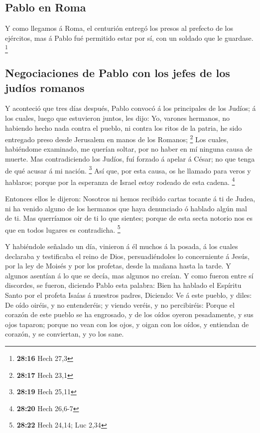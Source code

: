 \hypertarget{pablo-en-roma}{%
\subsection{Pablo en Roma}\label{pablo-en-roma}}

 Y como llegamos á Roma, el centurión entregó los presos
al prefecto de los ejércitos, mas á Pablo fué permitido estar por sí,
con un soldado que le guardase. \footnote{\textbf{28:16} Hech 27,3}

\hypertarget{negociaciones-de-pablo-con-los-jefes-de-los-juduxedos-romanos}{%
\subsection{Negociaciones de Pablo con los jefes de los judíos
romanos}\label{negociaciones-de-pablo-con-los-jefes-de-los-juduxedos-romanos}}

 Y aconteció que tres días después, Pablo convocó á los
principales de los Judíos; á los cuales, luego que estuvieron juntos,
les dijo: Yo, varones hermanos, no habiendo hecho nada contra el pueblo,
ni contra los ritos de la patria, he sido entregado preso desde
Jerusalem en manos de los Romanos; \footnote{\textbf{28:17} Hech 23,1}
 Los cuales, habiéndome examinado, me querían soltar, por
no haber en mí ninguna causa de muerte.  Mas
contradiciendo los Judíos, fuí forzado á apelar á César; no que tenga de
qué acusar á mi nación. \footnote{\textbf{28:19} Hech 25,11}
 Así que, por esta causa, os he llamado para veros y
hablaros; porque por la esperanza de Israel estoy rodeado de esta
cadena. \footnote{\textbf{28:20} Hech 26,6-7}

 Entonces ellos le dijeron: Nosotros ni hemos recibido
cartas tocante á ti de Judea, ni ha venido alguno de los hermanos que
haya denunciado ó hablado algún mal de ti.  Mas
querríamos oir de ti lo que sientes; porque de esta secta notorio nos es
que en todos lugares es contradicha. \footnote{\textbf{28:22} Hech
  24,14; Luc 2,34}

 Y habiéndole señalado un día, vinieron á él muchos á la
posada, á los cuales declaraba y testificaba el reino de Dios,
persuadiéndoles lo concerniente á Jesús, por la ley de Moisés y por los
profetas, desde la mañana hasta la tarde.  Y algunos
asentían á lo que se decía, mas algunos no creían.  Y
como fueron entre sí discordes, se fueron, diciendo Pablo esta palabra:
Bien ha hablado el Espíritu Santo por el profeta Isaías á nuestros
padres,  Diciendo: Ve á este pueblo, y diles: De oído
oiréis, y no entenderéis; y viendo veréis, y no percibiréis:
 Porque el corazón de este pueblo se ha engrosado, y de
los oídos oyeron pesadamente, y sus ojos taparon; porque no vean con los
ojos, y oigan con los oídos, y entiendan de corazón, y se conviertan, y
yo los sane.

